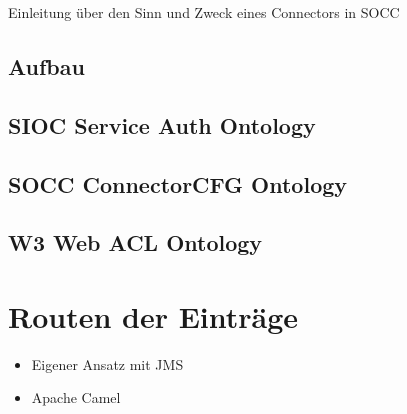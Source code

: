 Einleitung über den Sinn und Zweck eines Connectors in SOCC

\subsection{Aufbau} %
  \label{sub:aufbau}
  
\subsection{SIOC Service Auth Ontology} %
\label{sub:sioc_service_auth_ontology}

\subsection{SOCC ConnectorCFG Ontology} %
\label{sub:socc_connectorcfg_ontology}

\subsection{W3 Web ACL Ontology} %
\label{sub:w3_web_acl_ontology}



\section{Routen der Einträge} %
\label{sec:messageing}

\begin{itemize}
    \item Eigener Ansatz mit JMS
    \item Apache Camel
\end{itemize}

